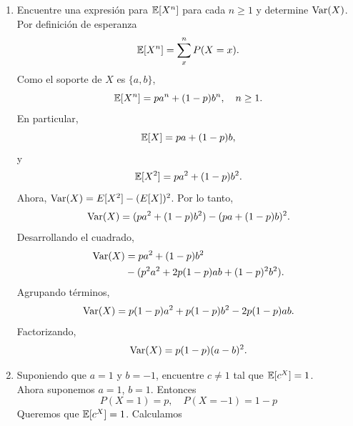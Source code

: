 \documentclass[12pt,a4paper]{article}
\begin{document}
    \begin{solucion}
        \begin{enumerate}
            \item[(a)] Encuentre una expresión para $\mathbb{E}[X^{n}]$ para cada $n\geq1$ y determine $\operatorname{Var}(X)$.\\
            Por definición de esperanza
            \begin{equation*}
                \mathbb{E}[X^{n}]=\sum_{x}^{n}P(X=x).
            \end{equation*}
            Como el soporte de $X$ es $\{a,b\}$,
            \begin{equation*}
                \mathbb{E}[X^{n}]=pa^{n}+(1-p)b^{n},\quad n\geq1.
            \end{equation*}
            En particular,
            \begin{equation*}
                \mathbb{E}[X]=pa+(1-p)b,
            \end{equation*}
            y
            \begin{equation*}
                \mathbb{E}[X^{2}]=pa^{2}+(1-p)b^{2}.
            \end{equation*}
            Ahora, $\operatorname{Var}(X)=E[X^{2}]-(E[X])^{2}$. Por lo tanto,
            \begin{equation*}
                \operatorname{Var}(X)=(pa^{2}+(1-p)b^{2})-(pa+(1-p)b)^{2}.
            \end{equation*}
            Desarrollando el cuadrado,
            \begin{align*}
                \operatorname{Var}(X)&=pa^{2}+(1-p)b^{2}\\
                &-(p^{2}a^{2}+2p(1-p)ab+(1-p)^{2}b^{2}).
            \end{align*}
            Agrupando términos,
            \begin{equation*}
                \operatorname{Var}(X)=p(1-p)a^{2}+p(1-p)b^{2}-2p(1-p)ab.
            \end{equation*}
            Factorizando,
            \begin{equation*}
                \operatorname{Var}(X)=p(1-p)(a-b)^{2}.
            \end{equation*}
            \item[(b)] Suponiendo que $a=1$ y $b=-1$, encuentre $c\neq1$ tal que $\mathbb{E}[c^{X}]=1$.\\
            Ahora suponemos $a=1$, $b=1$. Entonces
            \begin{equation*}
                P(X=1)=p,\quad P(X=-1)=1-p
            \end{equation*}
            Queremos que $\mathbb{E}[c^{X}]=1$. Calculamos

\end{enumerate}
\end{solucion}
\end{document}

